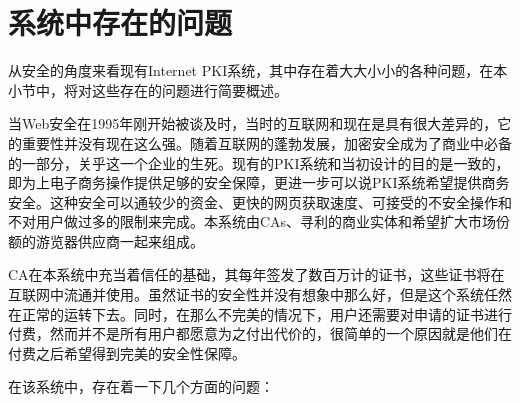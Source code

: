 \section{系统中存在的问题}

从安全的角度来看现有Internet PKI系统，其中存在着大大小小的各种问题，在本小节中，将对这些存在的问题进行简要概述。

当Web安全在1995年刚开始被谈及时，当时的互联网和现在是具有很大差异的，它的重要性并没有现在这么强。随着互联网的蓬勃发展，加密安全成为了商业中必备的一部分，关乎这一个企业的生死。现有的PKI系统和当初设计的目的是一致的，即为上电子商务操作提供足够的安全保障，更进一步可以说PKI系统希望提供商务安全。这种安全可以通较少的资金、更快的网页获取速度、可接受的不安全操作和不对用户做过多的限制来完成。本系统由CAs、寻利的商业实体和希望扩大市场份额的游览器供应商一起来组成。

CA在本系统中充当着信任的基础，其每年签发了数百万计的证书，这些证书将在互联网中流通并使用。虽然证书的安全性并没有想象中那么好，但是这个系统任然在正常的运转下去。同时，在那么不完美的情况下，用户还需要对申请的证书进行付费，然而并不是所有用户都愿意为之付出代价的，很简单的一个原因就是他们在付费之后希望得到完美的安全性保障。

在该系统中，存在着一下几个方面的问题：


